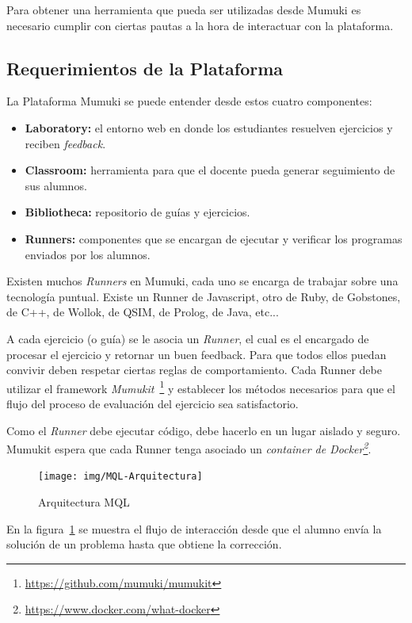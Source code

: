 
Para obtener una herramienta que pueda ser utilizadas desde
Mumuki es necesario cumplir con ciertas pautas a la hora
de interactuar con la plataforma.

\subsection{Requerimientos de la Plataforma}

La Plataforma Mumuki se puede entender desde estos cuatro componentes:

\begin{itemize}
    \item \textbf{Laboratory:} el entorno web en donde los estudiantes resuelven ejercicios y reciben \textit{feedback}.
    \item \textbf{Classroom:} herramienta para que el docente pueda generar seguimiento de sus alumnos.
    \item \textbf{Bibliotheca:} repositorio de guías y ejercicios.
    \item \textbf{Runners:} componentes que se encargan de ejecutar y verificar los programas enviados por los alumnos.
\end{itemize}

Existen muchos \textit{Runners} en Mumuki, cada uno se encarga
de trabajar sobre una tecnología puntual.
Existe un Runner de Javascript, otro de Ruby, de Gobstones, de C++, de Wollok,
de QSIM, de Prolog, de Java, etc...

A cada ejercicio (o guía) se le asocia un \textit{Runner},
el cual es el encargado de procesar el ejercicio y retornar
un buen feedback. Para que todos ellos puedan convivir deben
respetar ciertas reglas de comportamiento.
Cada Runner debe utilizar el framework
\textit{Mumukit}~\footnote{\url{https://github.com/mumuki/mumukit}}
y establecer los métodos necesarios para que el flujo del proceso de
evaluación del ejercicio sea satisfactorio.

Como el \textit{Runner} debe ejecutar código, debe hacerlo en
un lugar aislado y seguro. Mumukit espera que cada Runner
tenga asociado un \textit{container de Docker\footnote{\url{https://www.docker.com/what-docker}}}.


\begin{figure}[h]
  \centering
  \texttt{[image: img/MQL-Arquitectura]}
  \caption{Arquitectura MQL}
  \label{fig:arquitectura}
\end{figure}

En la figura~\ref{fig:arquitectura} se muestra el flujo de interacción
desde que el alumno envía la solución de un problema hasta que obtiene
la corrección.

